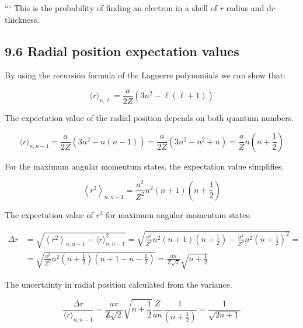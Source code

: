 \documentclass[10pt]{article}
\begin{document}
```
This is the probability of finding an electron in a shell of $r$ radius and $\mathrm{d} r$ thickness.

\subsection*{9.6 Radial position expectation values}
By using the recursion formula of the Laguerre polynomials we can show that:

\begin{equation*}
\langle r\rangle_{n, \ell}=\frac{a}{2 Z}\left(3 n^{2}-\ell(\ell+1)\right) \tag{9.100}
\end{equation*}

The expectation value of the radial position depends on both quantum numbers.

\begin{equation*}
\langle r\rangle_{n, n-1}=\frac{a}{2 Z}\left(3 n^{2}-n(n-1)\right)=\frac{a}{2 Z}\left(3 n^{2}-n^{2}+n\right)=\frac{a}{Z} n\left(n+\frac{1}{2}\right) \tag{9.101}
\end{equation*}

For the maximum angular momentum states, the expectation value simplifies.

\begin{equation*}
\left\langle r^{2}\right\rangle_{n, n-1}=\frac{a^{2}}{Z^{2}} n^{2}(n+1)\left(n+\frac{1}{2}\right) \tag{9.102}
\end{equation*}

The expectation value of $r^2$ for maximum angular momentum states.

\begin{align*}
\Delta r & =\sqrt{\left\langle r^{2}\right\rangle_{n, n-1}-\langle r\rangle_{n, n-1}^{2}}=\sqrt{\frac{a^{2}}{Z^{2}} n^{2}(n+1)\left(n+\frac{1}{2}\right)-\frac{a^{2}}{Z^{2}} n^{2}\left(n+\frac{1}{2}\right)^{2}}= \\
& =\sqrt{\frac{a^{2}}{Z^{2}} n^{2}\left(n+\frac{1}{2}\right)\left(n+1-n-\frac{1}{2}\right)}=\frac{a n}{Z \sqrt{2}} \sqrt{n+\frac{1}{2}} \tag{9.103}
\end{align*}

The uncertainty in radial position calculated from the variance.

\begin{equation*}
\frac{\Delta r}{\langle r\rangle_{n, n-1}}=\frac{a \pi}{\not Z \sqrt{2}} \sqrt{n+\frac{1}{2}} \frac{Z}{a n} \frac{1}{\left(n+\frac{1}{2}\right)}=\frac{1}{\sqrt{2 n+1}} \tag{9.104}
\end{equation*}
\end{document}
